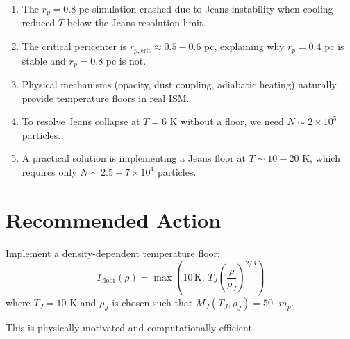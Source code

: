 \documentclass[12pt,a4paper]{article}
\begin{document}
\begin{enumerate}
    \item The $r_p = 0.8$ pc simulation crashed due to Jeans instability when
          cooling reduced $T$ below the Jeans resolution limit.

    \item The critical pericenter is $r_{p,\text{crit}} \approx 0.5-0.6$ pc,
          explaining why $r_p = 0.4$ pc is stable and $r_p = 0.8$ pc is not.

    \item Physical mechanisms (opacity, dust coupling, adiabatic heating)
          naturally provide temperature floors in real ISM.

    \item To resolve Jeans collapse at $T = 6$ K without a floor, we need
          $N \sim 2 \times 10^5$ particles.

    \item A practical solution is implementing a Jeans floor at $T \sim 10-20$ K,
          which requires only $N \sim 2.5-7 \times 10^4$ particles.
\end{enumerate}

\section{Recommended Action}

Implement a density-dependent temperature floor:
\begin{equation}
    T_{\text{floor}}(\rho) = \max\left(10 \, \text{K}, \, T_J \left(\frac{\rho}{\rho_J}\right)^{2/3}\right)
\end{equation}
where $T_J = 10$ K and $\rho_J$ is chosen such that $M_J(T_J, \rho_J) = 50 \cdot m_p$.

This is physically motivated and computationally efficient.
\end{document}
